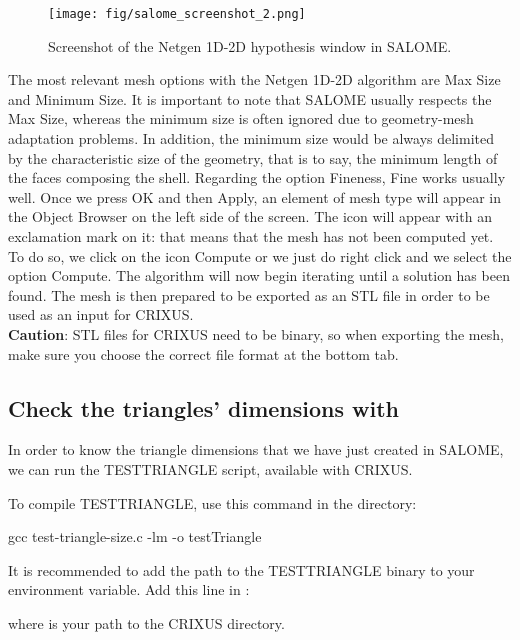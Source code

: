 \begin{figure}[h]
  \begin{center}
    \texttt{[image: fig/salome\_screenshot\_2.png]}
    \caption{Screenshot of the Netgen 1D-2D hypothesis window in SALOME.}\label{fig:salome_screenshot_2}   
  \end{center}
\end{figure}

The most relevant mesh options with the Netgen 1D-2D algorithm 
are Max Size and Minimum Size. 
It is important to note that SALOME usually respects the Max Size, 
whereas the minimum size is often ignored due to geometry-mesh 
adaptation problems. In addition, the minimum size would be 
always delimited by the characteristic size of the geometry, 
that is to say, the minimum length of the faces composing the shell. 
Regarding the option Fineness, Fine works usually well. 
Once we press OK and then Apply, an element of mesh type 
will appear in the Object Browser on the left side of the screen. 
The icon will appear with an exclamation mark on it: that means 
that the mesh has not been computed yet. To do so, we click on 
the icon Compute or we just do right click and we select 
the option Compute. The algorithm will now begin iterating 
until a solution has been found. 
The mesh is then prepared to be exported as an STL file 
in order to be used as an input for CRIXUS. \\

\textbf{Caution}: STL files for CRIXUS need to be binary, 
so when exporting the mesh, make sure you choose the correct 
file format at the bottom tab.


\subsection{Check the triangles' dimensions with }
In order to know the triangle dimensions that we have just created in SALOME, 
we can run the TESTTRIANGLE script, available with CRIXUS.

To compile TESTTRIANGLE, use this command in the  directory:
\begin{shellcode}
gcc test-triangle-size.c -lm -o testTriangle
\end{shellcode}
It is recommended to add the path to the TESTTRIANGLE binary to your
 environment variable. Add this line in :
where  is your path to the CRIXUS directory.

